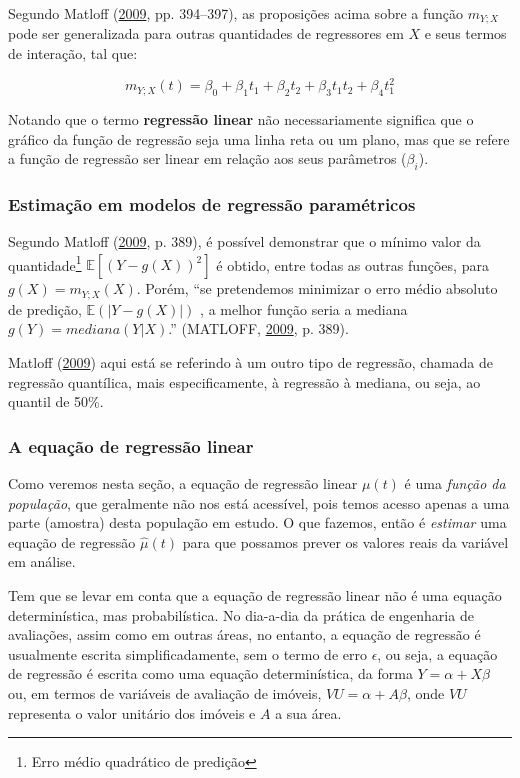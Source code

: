 \documentclass[a4paper, 12pt]{article}
\let\rmarkdownfootnote\footnote%
\def\footnote{\protect\rmarkdownfootnote}
\begin{document}
Segundo Matloff (\protect\hyperlink{ref-matloff2009}{2009}, pp.
394--397), as proposições acima sobre a função \(m_{Y;X}\) pode ser
generalizada para outras quantidades de regressores em \(X\) e seus
termos de interação, tal que:

\[m_{Y;X}(t) = \beta_0 + \beta_1t_1 + \beta_2t_2 + \beta_3t_1t_2 + \beta_4t_1^2\]

Notando que o termo \textbf{regressão linear} não necessariamente
significa que o gráfico da função de regressão seja uma linha reta ou um
plano, mas que se refere a função de regressão ser linear em relação aos
seus parâmetros (\(\beta_i\)).

\subsubsection{Estimação em modelos de regressão
paramétricos}\label{estimacao-em-modelos-de-regressao-parametricos}

Segundo Matloff (\protect\hyperlink{ref-matloff2009}{2009}, p. 389), é
possível demonstrar que o mínimo valor da quantidade\footnote{Erro médio
  quadrático de predição} \(\mathbb{E}[(Y - g(X))^2]\) é obtido, entre
todas as outras funções, para \(g(X) = m_{Y;X}(X)\). Porém, ``se
pretendemos minimizar o erro médio absoluto de predição,
\(\mathbb{E}(|Y - g(X)|)\) , a melhor função seria a mediana
\(g(Y) = mediana(Y|X)\).'' (MATLOFF,
\protect\hyperlink{ref-matloff2009}{2009}, p. 389).

Matloff (\protect\hyperlink{ref-matloff2009}{2009}) aqui está se
referindo à um outro tipo de regressão, chamada de regressão quantílica,
mais especificamente, à regressão à mediana, ou seja, ao quantil de
50\%.

\subsubsection{A equação de regressão
linear}\label{a-equacao-de-regressao-linear}

Como veremos nesta seção, a equação de regressão linear \(\mu(t)\) é uma
\emph{função da população}, que geralmente não nos está acessível, pois
temos acesso apenas a uma parte (amostra) desta população em estudo. O
que fazemos, então é \emph{estimar} uma equação de regressão
\(\hat{\mu}(t)\) para que possamos prever os valores reais da variável
em análise.

Tem que se levar em conta que a equação de regressão linear não é uma
equação determinística, mas probabilística. No dia-a-dia da prática de
engenharia de avaliações, assim como em outras áreas, no entanto, a
equação de regressão é usualmente escrita simplificadamente, sem o termo
de erro \(\epsilon\), ou seja, a equação de regressão é escrita como uma
equação determinística, da forma \(Y = \alpha + X\beta\) ou, em termos
de variáveis de avaliação de imóveis, \(VU = \alpha + A\beta\), onde
\(VU\) representa o valor unitário dos imóveis e \(A\) a sua área.
\end{document}

